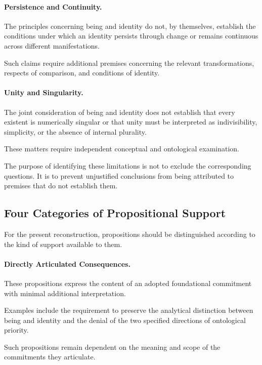 \paragraph{Persistence and Continuity.}

The principles concerning being and identity do not, by
themselves, establish the conditions under which an identity
persists through change or remains continuous across different
manifestations.

Such claims require additional premises concerning the
relevant transformations, respects of comparison, and
conditions of identity.

\paragraph{Unity and Singularity.}

The joint consideration of being and identity does not
establish that every existent is numerically singular or
that unity must be interpreted as indivisibility, simplicity,
or the absence of internal plurality.

These matters require independent conceptual and ontological
examination.

The purpose of identifying these limitations is not to
exclude the corresponding questions. It is to prevent
unjustified conclusions from being attributed to premises
that do not establish them.

\subsection{Four Categories of Propositional Support}

For the present reconstruction, propositions should be
distinguished according to the kind of support available
to them.

\paragraph{Directly Articulated Consequences.}

These propositions express the content of an adopted
foundational commitment with minimal additional interpretation.

Examples include the requirement to preserve the analytical
distinction between being and identity and the denial of
the two specified directions of ontological priority.

Such propositions remain dependent on the meaning and scope
of the commitments they articulate.

